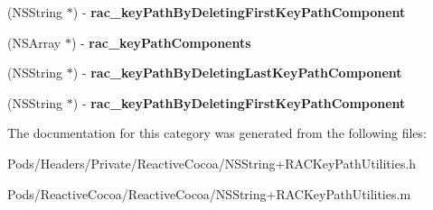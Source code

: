 \begin{DoxyCompactItemize}
(N\+S\+String $\ast$) -\/ {\bfseries rac\+\_\+key\+Path\+By\+Deleting\+First\+Key\+Path\+Component}
\item 
\mbox{\label{category_n_s_string_07_r_a_c_key_path_utilities_08_a7297adece3baebb3fdae06b22ff32f0a}} 
(N\+S\+Array $\ast$) -\/ {\bfseries rac\+\_\+key\+Path\+Components}
\item 
\mbox{\label{category_n_s_string_07_r_a_c_key_path_utilities_08_a271796bb7289b16588453e1a7a8db1f3}} 
(N\+S\+String $\ast$) -\/ {\bfseries rac\+\_\+key\+Path\+By\+Deleting\+Last\+Key\+Path\+Component}
\item 
\mbox{\label{category_n_s_string_07_r_a_c_key_path_utilities_08_adf1fe82d6788653e105383a8e8b3a50f}} 
(N\+S\+String $\ast$) -\/ {\bfseries rac\+\_\+key\+Path\+By\+Deleting\+First\+Key\+Path\+Component}
\end{DoxyCompactItemize}


The documentation for this category was generated from the following files\+:\begin{DoxyCompactItemize}
\item 
Pods/\+Headers/\+Private/\+Reactive\+Cocoa/N\+S\+String+\+R\+A\+C\+Key\+Path\+Utilities.\+h\item 
Pods/\+Reactive\+Cocoa/\+Reactive\+Cocoa/N\+S\+String+\+R\+A\+C\+Key\+Path\+Utilities.\+m\end{DoxyCompactItemize}
